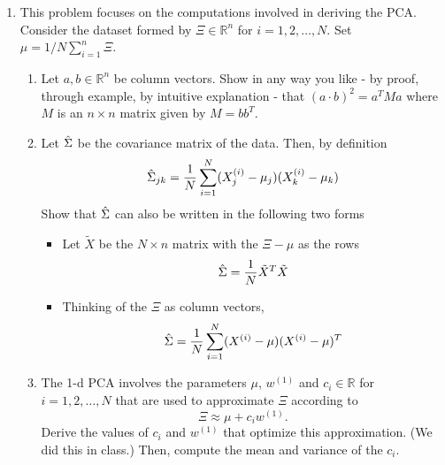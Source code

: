 \documentclass{article}
\begin{document}
\begin{enumerate}
\item This problem focuses on the computations involved in deriving the PCA.  Consider the dataset formed by  $\Xi \in \mathbb{R}^n$ for $i=1,2,\dots,N$.   Set $\mu = 1/N \sum_{i=1}^n \Xi$.
\begin{enumerate}
\item Let $a,b \in \mathbb{R}^n$ be column vectors.  Show in any way you like - by proof, through example, by intuitive explanation - that $(a \cdot b)^2 = a^T M a$ where $M$ is an $n \times n$ matrix given by $M = bb^T$.
\item Let $\hat{\Sigma}$ be the covariance matrix of the data.  Then, by definition 
\begin{equation}
\hat{\Sigma}_{jk} = \frac{1}{N} \sum_{i=1}^N (X^{(i)}_j - \mu_j)(X^{(i)}_k - \mu_k)
\end{equation}
Show that $\hat{\Sigma}$ can also be written in the following two forms
\begin{itemize}
\item   Let $\tilde{X}$ be the $N \times n$ matrix with the $\Xi - \mu$ as the rows
\begin{equation}
\hat{\Sigma} = \frac{1}{N} \tilde{X}^T \tilde{X}
\end{equation}
\item Thinking of the $\Xi$ as column vectors,
\begin{equation}
\hat{\Sigma} = \frac{1}{N} \sum_{i=1}^N (X^{(i)} - \mu) (X^{(i)} - \mu)^T
\end{equation}
\end{itemize}
\item The 1-d PCA involves the parameters $\mu$, $w^{(1)}$ and $c_i \in \mathbb{R}$ for $i=1,2,\dots,N$ that are used to approximate $\Xi$ according to
\begin{equation}
\Xi \approx \mu + c_i w^{(1)}.
\end{equation}
Derive the values of $c_i$ and $w^{(1)}$ that optimize this approximation.  (We did this in class.)  Then, compute the mean and variance of the $c_i$.  
\end{enumerate}

\end{enumerate}
\end{document}
